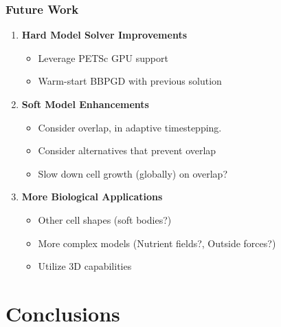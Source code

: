 \documentclass[10pt,t]{beamer}
\begin{document}
\begin{frame}
    \frametitle{Future Work}

    \begin{enumerate}
        \item \textbf{Hard Model Solver Improvements}
              \begin{itemize}
                  \item Leverage PETSc GPU support
                  \item Warm-start BBPGD with previous solution
              \end{itemize}

              \vspace{0.3cm}

        \item \textbf{Soft Model Enhancements}
              \begin{itemize}
                  \item Consider overlap, in adaptive timestepping.
                  \item Consider alternatives that prevent overlap
                  \item Slow down cell growth (globally) on overlap?
              \end{itemize}

              \vspace{0.3cm}

        \item \textbf{More Biological Applications}
              \begin{itemize}
                  \item Other cell shapes (soft bodies?)
                  \item More complex models (Nutrient fields?, Outside forces?)
                  \item Utilize 3D capabilities
              \end{itemize}
    \end{enumerate}

\end{frame}


\section*{Conclusions}
\end{document}
